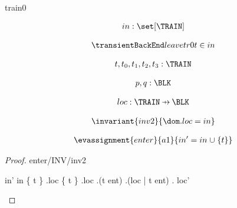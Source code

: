 \documentclass[12pt]{amsart}
\title{}
\author{}
\date{} %
\begin{document}
\maketitle
\tableofcontents


\begin{machine}{train0}


%
	\begin{align*}
\variable{		in : \set[\TRAIN]}
	\end{align*}
%



\begin{align*}
\transient{leave}{tr0}
{	t \in in}
\end{align*}

\begin{align*}
\dummy{	t,t_0,t_1,t_2,t_3 : \TRAIN}
\end{align*}

\begin{align*}
\dummy{	p,q : \BLK}
\end{align*}


\begin{align*}
\variable{	loc : \TRAIN \pfun \BLK}
\end{align*}

\begin{align*}
\invariant{inv2}
{	\dom . loc = in }
\end{align*}

\begin{align*}
\evassignment{enter}{a1}
{	in' = in \bunion \{ t \} }
\end{align*}

\begin{proof}{enter/INV/inv2}
	\begin{calculation}
		in'
	\hint{=}{ \ref{a1} }
		in \bunion \{ t \}
	\hint{=}{ \ref{inv2} }
		\dom.loc \bunion \{ t \}
		\dom.loc \bunion \dom.(t \tfun ent)
		\dom.(loc  \1 |   t \tfun ent)
	\hint{=}{ \ref{a2} }
		\dom. loc' 
	\end{calculation}
\end{proof}


\end{machine}
\end{document}
